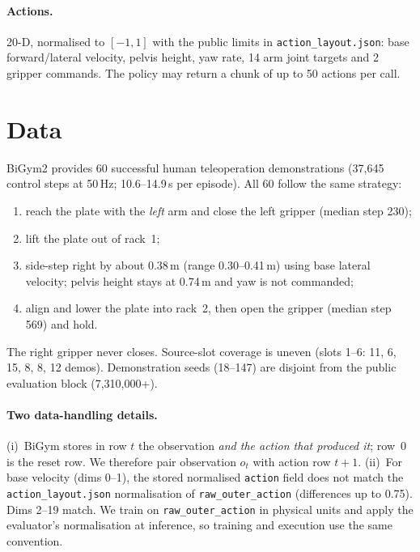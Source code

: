 \documentclass[11pt,a4paper]{article}
\begin{document}
\paragraph{Actions.} 20-D, normalised to $[-1,1]$ with the public limits in
\texttt{action\_layout.json}: base forward/lateral velocity, pelvis height,
yaw rate, 14 arm joint targets and 2 gripper commands. The policy may return
a chunk of up to 50 actions per call.

\section{Data}

BiGym2 provides 60 successful human teleoperation demonstrations
(37{,}645 control steps at 50\,Hz; 10.6--14.9\,s per episode). All 60 follow
the same strategy:
\begin{enumerate}
  \item reach the plate with the \emph{left} arm and close the left gripper
        (median step 230);
  \item lift the plate out of rack~1;
  \item side-step right by about 0.38\,m (range 0.30--0.41\,m) using base lateral
        velocity; pelvis height stays at 0.74\,m and yaw is not commanded;
  \item align and lower the plate into rack~2, then open the gripper
        (median step 569) and hold.
\end{enumerate}
The right gripper never closes. Source-slot coverage is uneven
(slots 1--6: 11, 6, 15, 8, 8, 12 demos). Demonstration seeds (18--147) are
disjoint from the public evaluation block (7{,}310{,}000+).

\paragraph{Two data-handling details.}
(i)~BiGym stores in row $t$ the observation \emph{and the action that
produced it}; row~0 is the reset row. We therefore pair observation $o_t$
with action row $t{+}1$.
(ii)~For base velocity (dims 0--1), the stored normalised \texttt{action}
field does not match the \texttt{action\_layout.json} normalisation of
\texttt{raw\_outer\_action} (differences up to 0.75). Dims 2--19 match. We
train on \texttt{raw\_outer\_action} in physical units and apply the
evaluator's normalisation at inference, so training and execution use the
same convention.
\end{document}
